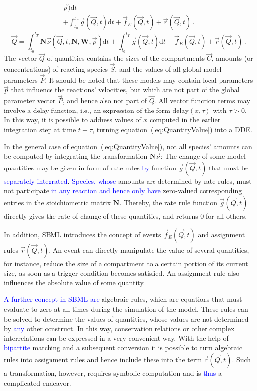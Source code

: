 \documentclass[10pt]{bmc_article}
\newenvironment{bmcformat}{\fussy\setboolean{publ}{true}}{\fussy}
\newcommand{\COR}[1]                      {\textcolor{blue}{#1}}
\newcommand{\D}{\mathrm{d}}
\begin{document}
\begin{bmcformat}
{\begin{multline}
\vec{p})\D t\\ 
+ \int_{t_0}^{t_T} \vec{g}(\vec{Q}, t)\D t + \vec{f}_E(\vec{Q}, t) + \vec{r}(\vec{Q}, t)\,.
\label{eq:QuantityValue}
\end{multline}}{\begin{equation}
\vec{Q} = \int_{t_0}^{t_T} \mathbf{N}\vec{\nu}(\vec{Q}, t, \mathbf{N}, \mathbf{W},
\vec{p})\D t + \int_{t_0}^{t_T} \vec{g}(\vec{Q}, t)\D t + \vec{f}_E(\vec{Q}, t) + \vec{r}(\vec{Q}, t)\,.
\label{eq:QuantityValue}
\end{equation}}
The vector $\vec{Q}$ of quantities contains the sizes of the
compartments $\vec{C}$, amounts (or concentrations) of reacting species
$\vec{S}$, and the values of all global model parameters $\vec{P}$.
It should be noted that these models may contain local parameters $\vec{p}$ that
influence the reactions' velocities, but which are not part of the global parameter
vector $\vec{P}$, and hence also not part of $\vec{Q}$.
All vector function terms may involve a delay function, i.e., an expression of 
the form $\mathrm{delay}(x, \tau)$ with $\tau > 0$. In this way, it is possible
to address values of $x$ computed in the earlier integration step at time 
$t - \tau$, turning equation~(\ref{eq:QuantityValue})
into a \acf{DDE}.

In the general case of equation~(\ref{eq:QuantityValue}), not all species' amounts
can be computed by integrating the transformation $\mathbf{N}\vec{\nu}$: The
change of some model quantities may be given in form of rate rules \COR{by}
function $\vec{g}(\vec{Q}, t)$ that must be \COR{separately integrated}.
\COR{Species, whose} amounts are determined by rate rules, must not participate \COR{in any
reaction and hence only have} zero-valued corresponding entries in the
stoichiometric matrix $\mathbf{N}$.
Thereby, the rate rule function $\vec{g}(\vec{Q}, t)$ directly gives the rate of
change of these quantities, and returns 0 for all others.

In addition, \acs{SBML} introduces the concept of events $\vec{f}_E(\vec{Q}, t)$ and
assignment rules $\vec{r}(\vec{Q}, t)$.
An event can directly manipulate the value of several quantities, for instance,
reduce the size of a compartment to a certain portion of its current size,
as soon as a trigger condition becomes satisfied.
An assignment rule also influences the absolute value of some quantity.

\COR{A further concept in \acs{SBML} are} algebraic rules, which are equations that
must evaluate to zero at all times during the simulation of the model.
These rules can be solved to determine the values of quantities, whose values
are not determined by \COR{any} other construct.
In this way, conservation relations or other complex interrelations can be
expressed in a very convenient way.
With the help of \COR{bipartite} matching \cite{hopcroft1973n} and a subsequent conversion it is possible
to turn algebraic rules into assignment rules and hence include these into the
term $\vec{r}(\vec{Q}, t)$.
Such a transformation, however, requires symbolic computation and is
\COR{thus} a complicated endeavor.


\end{bmcformat}
\end{document}
